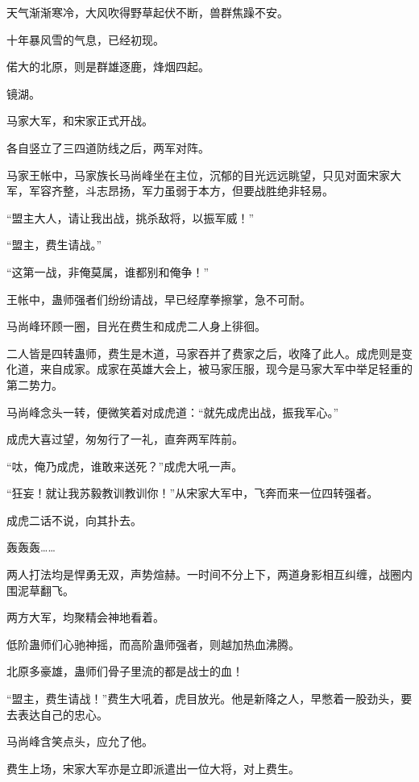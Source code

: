 
\begin{this_body}

天气渐渐寒冷，大风吹得野草起伏不断，兽群焦躁不安。

十年暴风雪的气息，已经初现。

偌大的北原，则是群雄逐鹿，烽烟四起。

镜湖。

马家大军，和宋家正式开战。

各自竖立了三四道防线之后，两军对阵。

马家王帐中，马家族长马尚峰坐在主位，沉郁的目光远远眺望，只见对面宋家大军，军容齐整，斗志昂扬，军力虽弱于本方，但要战胜绝非轻易。

“盟主大人，请让我出战，挑杀敌将，以振军威！”

“盟主，费生请战。”

“这第一战，非俺莫属，谁都别和俺争！”

王帐中，蛊师强者们纷纷请战，早已经摩拳擦掌，急不可耐。

马尚峰环顾一圈，目光在费生和成虎二人身上徘徊。

二人皆是四转蛊师，费生是木道，马家吞并了费家之后，收降了此人。成虎则是变化道，来自成家。成家在英雄大会上，被马家压服，现今是马家大军中举足轻重的第二势力。

马尚峰念头一转，便微笑着对成虎道：“就先成虎出战，振我军心。”

成虎大喜过望，匆匆行了一礼，直奔两军阵前。

“呔，俺乃成虎，谁敢来送死？”成虎大吼一声。

“狂妄！就让我苏毅教训教训你！”从宋家大军中，飞奔而来一位四转强者。

成虎二话不说，向其扑去。

轰轰轰……

两人打法均是悍勇无双，声势煊赫。一时间不分上下，两道身影相互纠缠，战圈内围泥草翻飞。

两方大军，均聚精会神地看着。

低阶蛊师们心驰神摇，而高阶蛊师强者，则越加热血沸腾。

北原多豪雄，蛊师们骨子里流的都是战士的血！

“盟主，费生请战！”费生大吼着，虎目放光。他是新降之人，早憋着一股劲头，要去表达自己的忠心。

马尚峰含笑点头，应允了他。

费生上场，宋家大军亦是立即派遣出一位大将，对上费生。


\end{this_body}
